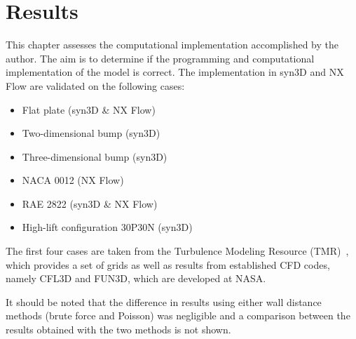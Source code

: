 \chapter{Results}
\label{chap:results}
This chapter assesses the computational implementation accomplished by the author. The aim is to determine if the programming and computational implementation of the model is correct. The implementation in syn3D and NX Flow are validated on the following cases:
\begin{itemize}
    \item Flat plate (syn3D \& NX Flow)
    \item Two-dimensional bump (syn3D)
    \item Three-dimensional bump (syn3D)
    \item NACA 0012 (NX Flow)
    \item RAE 2822 (syn3D \& NX Flow)
    \item High-lift configuration 30P30N (syn3D)
\end{itemize}
The first four cases are taken from the Turbulence Modeling Resource (TMR)~\cite{tmr}, which provides a set of grids as well as results from established CFD codes, namely CFL3D and FUN3D, which are developed at NASA.

It should be noted that the difference in results using either wall distance methods (brute force and Poisson) was negligible and a comparison between the results obtained with the two methods is not shown.







%
%